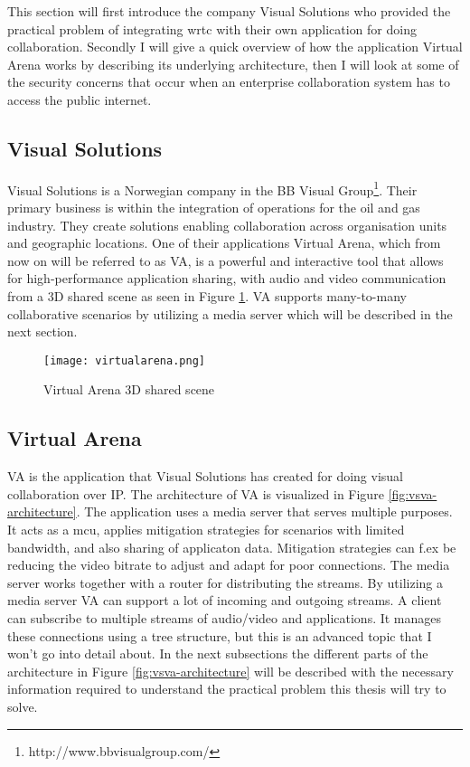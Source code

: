 This section will first introduce the company Visual Solutions who provided the practical problem of integrating \gls{wrtc} with their own application for doing collaboration. Secondly I will give a quick overview of how the application Virtual Arena works by describing its underlying architecture, then I will look at some of the security concerns that occur when an enterprise collaboration system has to access the public internet.

\subsection{Visual Solutions}
Visual Solutions is a Norwegian company in the BB Visual Group\footnote{http://www.bbvisualgroup.com/}. Their primary business is within the integration of operations for the oil and gas industry. They create solutions enabling collaboration across organisation units and geographic locations. One of their applications Virtual Arena\cite{solutions_b2_virtual_2014}, which from now on will be referred to as VA, is a powerful and interactive tool that allows for high-performance application sharing, with audio and video communication from a 3D shared scene as seen in Figure \ref{fig:vsva-3d-scene}. VA supports many-to-many collaborative scenarios by utilizing a media server which will be described in the next section.
\\
\begin{figure}[here]
\centerline{\texttt{[image: virtualarena.png]}}
\caption{Virtual Arena 3D shared scene}
\label{fig:vsva-3d-scene}
\end{figure}

\subsection{Virtual Arena}
VA is the application that Visual Solutions has created for doing visual collaboration over IP. The architecture of VA is visualized in Figure \ref{fig:vsva-architecture}. The application uses a media server that serves multiple purposes. It acts as a \gls{mcu}, applies mitigation strategies for scenarios with limited bandwidth, and also sharing of applicaton data. Mitigation strategies can f.ex be reducing the video bitrate to adjust and adapt for poor connections. The media server works together with a router for distributing the streams. By utilizing a media server VA can support a lot of incoming and outgoing streams. A client can subscribe to multiple streams of audio/video and applications. It manages these connections using a tree structure, but this is an advanced topic that I won't go into detail about. In the next subsections the different parts of the architecture in Figure \ref{fig:vsva-architecture} will be described with the necessary information required to understand the practical problem this thesis will try to solve.

